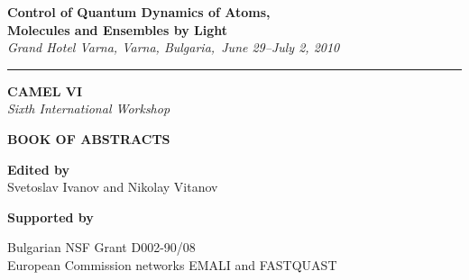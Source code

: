 \thispagestyle{empty}



\begin{center}

 {\LARGE \textsf{\textbf{Control of Quantum Dynamics of Atoms,}\\ \vspace{2mm} \textbf{Molecules and Ensembles by Light} }}\\ \vspace{2mm}
{\Large \emph{Grand Hotel Varna, Varna, Bulgaria,\ June 29--July 2, 2010}}

 \vspace{3mm}

\hrule

\vspace{25mm}

{\fontsize{40}{48}\selectfont \textsf{\textbf{CAMEL VI}}}\\
\vspace{5mm}
{\LARGE \emph{Sixth International Workshop}}\\

\vspace{25mm}

{\fontsize{36}{40}\selectfont \textsf{\textbf{BOOK OF  ABSTRACTS}}}\\

\vspace{15mm}

\Large{\textbf{Edited by} \\ Svetoslav Ivanov and Nikolay Vitanov}

\vspace{60mm}

{\Large \textbf{Supported by}

Bulgarian NSF Grant D002-90/08\\
European Commission networks EMALI and FASTQUAST

}




\end{center}

